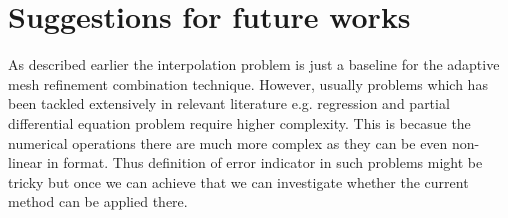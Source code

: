\section{Suggestions for future works}
As described earlier the interpolation problem is just a baseline for the adaptive mesh refinement combination technique. However, usually problems which has been tackled extensively in relevant literature e.g. regression and partial differential equation problem require higher complexity. This is becasue the numerical operations there are much more complex as they can be even non-linear in format. Thus definition of error indicator in such problems might be tricky but once we can achieve that we can investigate whether the current method can be applied there. 
